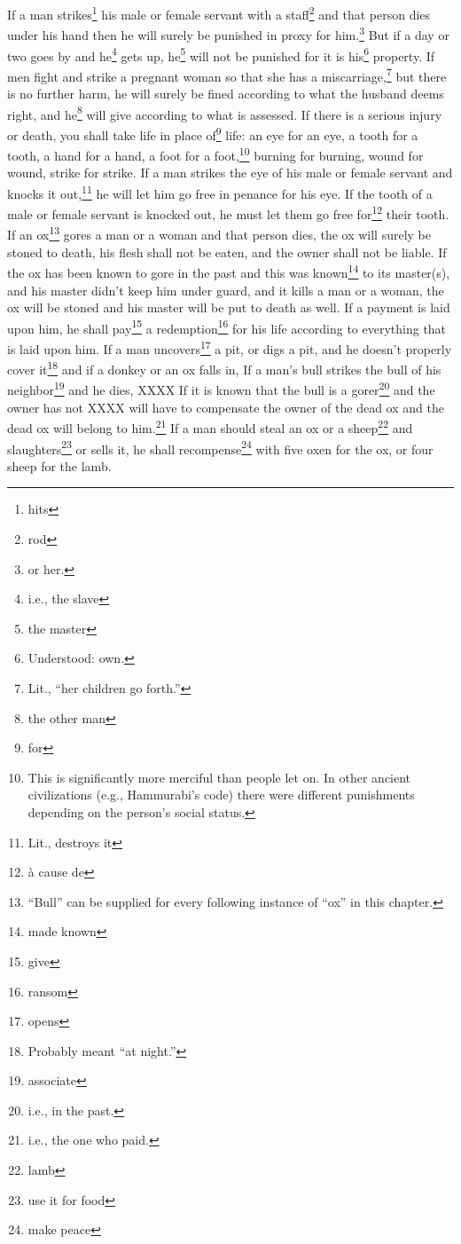 \begin{enumerate}[align=center]
     If a man strikes\footnote{hits} his male or female servant with a staff\footnote{rod} and that person dies under his hand then he will surely be punished in proxy for him.\footnote{or her.}%
     But if a day or two goes by and he\footnote{i.e., the slave} gets up, he\footnote{the master} will not be punished for it is his\footnote{Understood: own.} property.%
     If men fight and strike a pregnant woman so that she has a miscarriage,\footnote{Lit., ``her children go forth.''} but there is no further harm, he will surely be fined according to what the husband deems right, and he\footnote{the other man} will give according to what is assessed.%
     If there is a serious injury or death, you shall take life in place of\footnote{for} life:%
     an eye for an eye, a tooth for a tooth, a hand for a hand, a foot for a foot,\footnote{This is significantly more merciful than people let on. In other ancient civilizations (e.g., Hammurabi's code) there were different punishments depending on the person's social status.}%
     burning for burning, wound for wound, strike for strike.%
     If a man strikes the eye of his male or female servant and knocks it out,\footnote{Lit., destroys it} he will let him go free in penance for his eye.%
     If the tooth of a male or female servant is knocked out, he must let them go free for\footnote{\`a cause de} their tooth.%
     If an ox\footnote{``Bull'' can be supplied for every following instance of ``ox'' in this chapter.} gores a man or a woman and that person dies, the ox will surely be stoned to death, his flesh shall not be eaten, and the owner shall not be liable.%
     If the ox has been known to gore in the past and this was known\footnote{made known} to its master(s), and his master didn't keep him under guard, and it kills a man or a woman, the ox will be stoned and his master will be put to death as well.%
     If a payment is laid upon him, he shall pay\footnote{give} a redemption\footnote{ransom} for his life according to everything that is laid upon him.%
     If a man uncovers\footnote{opens} a pit, or digs a pit, and he doesn't properly cover it\footnote{Probably meant ``at night.''} and if a donkey or an ox falls in,%
     If a man's bull strikes the bull of his neighbor\footnote{associate} and he dies, XXXX%
     If it is known that the bull is a gorer\footnote{i.e., in the past.} and the owner has not XXXX will have to compensate the owner of the dead ox and the dead ox will belong to him.\footnote{i.e., the one who paid.}%
     If a man should steal an ox or a sheep\footnote{lamb} and slaughters\footnote{use it for food} or sells it, he shall recompense\footnote{make peace} with five oxen for the ox, or four sheep for the lamb.%
\end{enumerate}
